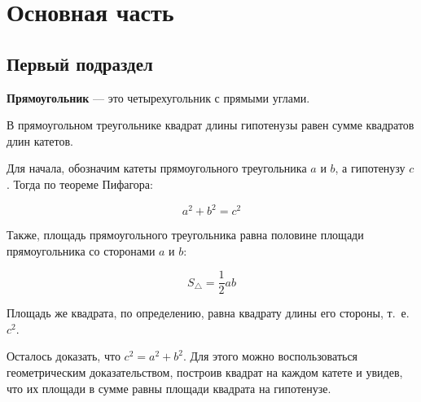 \section{Основная часть}

\subsection{Первый подраздел}

\begin{definition}
    \textbf{Прямоугольник} --- это четырехугольник с прямыми углами.
\end{definition}

\begin{lemma}
    В прямоугольном треугольнике квадрат длины гипотенузы равен сумме квадратов длин катетов.
\end{lemma}
\proof
Для начала, обозначим катеты прямоугольного треугольника $a$ и $b$, а гипотенузу $c$. Тогда по теореме Пифагора:

\begin{equation}
    a^2 + b^2 = c^2
\end{equation}

Также, площадь прямоугольного треугольника равна половине площади прямоугольника со сторонами $a$ и $b$:

\begin{equation}
    S_{\triangle} = \frac{1}{2} ab
\end{equation}

Площадь же квадрата, по определению, равна квадрату длины его стороны, т.~е.~$c^2$.

Осталось доказать, что $c^2 = a^2 + b^2$. Для этого можно воспользоваться геометрическим доказательством, построив квадрат на каждом катете и увидев, что их площади в сумме равны площади квадрата на гипотенузе.

